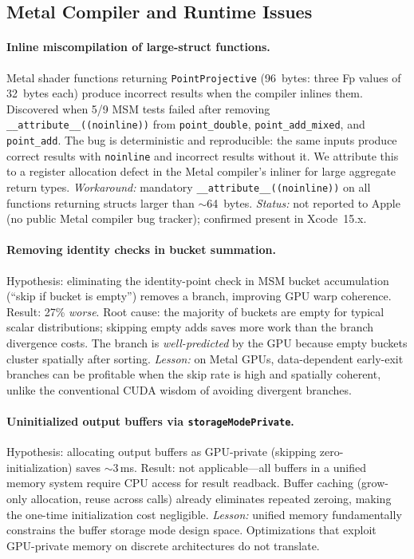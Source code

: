 \subsection{Metal Compiler and Runtime Issues}
\label{sec:dead-compiler}

\paragraph{Inline miscompilation of large-struct functions.}
Metal shader functions returning \texttt{PointProjective} (96~bytes: three Fp values of 32~bytes each) produce incorrect results when the compiler inlines them.
Discovered when 5/9 MSM tests failed after removing \texttt{\_\_attribute\_\_((noinline))} from \texttt{point\_double}, \texttt{point\_add\_mixed}, and \texttt{point\_add}.
The bug is deterministic and reproducible: the same inputs produce correct results with \texttt{noinline} and incorrect results without it.
We attribute this to a register allocation defect in the Metal compiler's inliner for large aggregate return types.
\emph{Workaround:} mandatory \texttt{\_\_attribute\_\_((noinline))} on all functions returning structs larger than $\sim$64~bytes.
\emph{Status:} not reported to Apple (no public Metal compiler bug tracker); confirmed present in Xcode~15.x.

\paragraph{Removing identity checks in bucket summation.}
Hypothesis: eliminating the identity-point check in MSM bucket accumulation (``skip if bucket is empty'') removes a branch, improving GPU warp coherence.
Result: 27\% \emph{worse}.
Root cause: the majority of buckets are empty for typical scalar distributions; skipping empty adds saves more work than the branch divergence costs.
The branch is \emph{well-predicted} by the GPU because empty buckets cluster spatially after sorting.
\emph{Lesson:} on Metal GPUs, data-dependent early-exit branches can be profitable when the skip rate is high and spatially coherent, unlike the conventional CUDA wisdom of avoiding divergent branches.

\paragraph{Uninitialized output buffers via \texttt{storageModePrivate}.}
Hypothesis: allocating output buffers as GPU-private (skipping zero-initialization) saves $\sim$3\,ms.
Result: not applicable---all buffers in a unified memory system require CPU access for result readback.
Buffer caching (grow-only allocation, reuse across calls) already eliminates repeated zeroing, making the one-time initialization cost negligible.
\emph{Lesson:} unified memory fundamentally constrains the buffer storage mode design space.
Optimizations that exploit GPU-private memory on discrete architectures do not translate.

